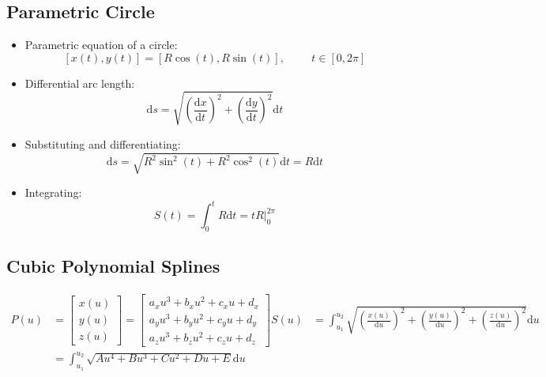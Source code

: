 \documentclass{article}
\begin{document}
\subsection*{Parametric Circle}
\begin{itemize}
    \item Parametric equation of a circle:
    \[[x(t), y(t)] = [R \cos(t), R\sin(t)], \hspace{1cm} t \in [0, 2\pi]\]
    \item Differential arc length:
    \[\text{d}s = \sqrt{\left(\frac{\text{d}x}{\text{d}t}\right)^2 + \left(\frac{\text{d}y}{\text{d}t}\right)^2} \text{d}t\]
    \item Substituting and differentiating:
    \[\text{d}s = \sqrt{R^2 \sin^2(t) + R^2 \cos^2(t)} \text{d}t = R \text{d}t\]
    \item Integrating: 
    \[S(t) = \int_0^t R\text{d}t = tR \vert_0^{2\pi}\]
\end{itemize}

\subsection*{Cubic Polynomial Splines}
\begin{align*}
    P(u) &= \begin{bmatrix} x(u) \\ y(u) \\ z(u) \end{bmatrix} = \begin{bmatrix}a_x u^3 + b_x u^2 + c_x u + d_x \\ a_y u^3 + b_y u^2 + c_y u + d_y \\ a_z u^3 + b_z u^2 + c_z u + d_z \end{bmatrix}  
    S(u) &= \int_{u_1}^{u_2} \sqrt{\left(\frac{x(u)}{\text{d}u}\right)^2 + \left(\frac{y(u)}{\text{d}u}\right)^2 + \left(\frac{z(u)}{\text{d}u}\right)^2} \text{d}u\\
    &= \int_{u_1}^{u_2} \sqrt{Au^4 + Bu^3 + Cu^2 + Du + E}\text{d}u
\end{align*}
\end{document}
